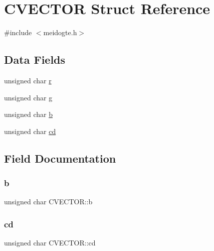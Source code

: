 \hypertarget{structCVECTOR}{}\section{C\+V\+E\+C\+T\+OR Struct Reference}
\label{structCVECTOR}


{\ttfamily \#include $<$meidogte.\+h$>$}

\subsection*{Data Fields}
\begin{DoxyCompactItemize}
\item 
unsigned char \hyperlink{structCVECTOR_a237eff5125e5e4fe378247461b06dcd3}{r}
\item 
unsigned char \hyperlink{structCVECTOR_a6c7da633ac0bd9459c0f9898c05cafd5}{g}
\item 
unsigned char \hyperlink{structCVECTOR_a7717c30f198cc21efcefe4877bca1f6c}{b}
\item 
unsigned char \hyperlink{structCVECTOR_aa44eee1632ccc21a99255d1ca8d2c353}{cd}
\end{DoxyCompactItemize}


\subsection{Field Documentation}
\mbox{\label{structCVECTOR_a7717c30f198cc21efcefe4877bca1f6c}} 
\subsubsection{\texorpdfstring{b}{b}}
{\footnotesize\ttfamily unsigned char C\+V\+E\+C\+T\+O\+R\+::b}

\mbox{\label{structCVECTOR_aa44eee1632ccc21a99255d1ca8d2c353}} 
\subsubsection{\texorpdfstring{cd}{cd}}
{\footnotesize\ttfamily unsigned char C\+V\+E\+C\+T\+O\+R\+::cd}

\mbox{\label{structCVECTOR_a6c7da633ac0bd9459c0f9898c05cafd5}} 
